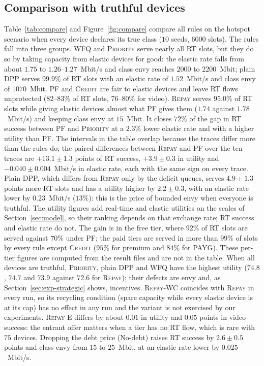 \documentclass[preprint,11pt]{elsarticle}
\theoremstyle{definition}
\theoremstyle{remark}
\newcommand{\repay}{\textsc{Repay}}
\begin{document}
\subsection{Comparison with truthful devices}\label{sec:exp-compare}

Table~\ref{tab:compare} and Figure~\ref{fig:compare} compare all rules on the hotspot scenario when every device declares its true class ($10$ seeds, $6000$ slots).
The rules fall into three groups.
\textsc{WFQ} and \textsc{Priority} serve nearly all RT slots, but they do so by taking capacity from elastic devices for good: the elastic rate falls from about $1.75$ to $1.26$--$1.27$~Mbit/s and class envy reaches $2000$ to $2200$~Mbit; plain DPP serves $99.9\%$ of RT slots with an elastic rate of $1.52$~Mbit/s and class envy of $1070$~Mbit.
\textsc{PF} and \textsc{Credit} are fair to elastic devices and leave RT flows unprotected ($82$--$83\%$ of RT slots, $76$--$80\%$ for video).
\repay{} serves $95.0\%$ of RT slots while giving elastic devices almost what \textsc{PF} gives them ($1.74$ against $1.78$~Mbit/s) and keeping class envy at $15$~Mbit.
It closes $72\%$ of the gap in RT success between \textsc{PF} and \textsc{Priority} at a $2.3\%$ lower elastic rate and with a higher utility than \textsc{PF}.
The intervals in the table overlap because the traces differ more than the rules do; the paired differences between \repay{} and \textsc{PF} over the ten traces are $+13.1\pm1.3$ points of RT success, $+3.9\pm0.3$ in utility and $-0.040\pm0.004$~Mbit/s in elastic rate, each with the same sign on every trace.
Plain DPP, which differs from \repay{} only by the deficit queues, serves $4.9\pm1.3$ points more RT slots and has a utility higher by $2.2\pm0.3$, with an elastic rate lower by $0.23$~Mbit/s ($13\%$): this is the price of bounded envy when everyone is truthful.
The utility figures add real-time and elastic utilities on the scales of Section~\ref{sec:model}, so their ranking depends on that exchange rate; RT success and elastic rate do not.
The gain is in the free tier, where $92\%$ of RT slots are served against $70\%$ under \textsc{PF}; the paid tiers are served in more than $99\%$ of slots by every rule except \textsc{Credit} ($95\%$ for premium and $84\%$ for PAYG). These per-tier figures are computed from the result files and are not in the table.
When all devices are truthful, \textsc{Priority}, plain DPP and \textsc{WFQ} have the highest utility ($74.8$, $74.7$ and $73.9$ against $72.6$ for \repay{}); their defects are envy and, as Section~\ref{sec:exp-strategic} shows, incentives.
\textsc{Repay-WC} coincides with \repay{} in every run, so its recycling condition (spare capacity while every elastic device is at its cap) has no effect in any run and the variant is not exercised by our experiments. \textsc{Repay-E} differs by about $0.01$ in utility and $0.05$ points in video success: the entrant offer matters when a tier has no RT flow, which is rare with $75$ devices.
Dropping the debt price (No-debt) raises RT success by $2.6\pm0.5$ points and class envy from $15$ to $25$~Mbit, at an elastic rate lower by $0.025$~Mbit/s.
\end{document}

